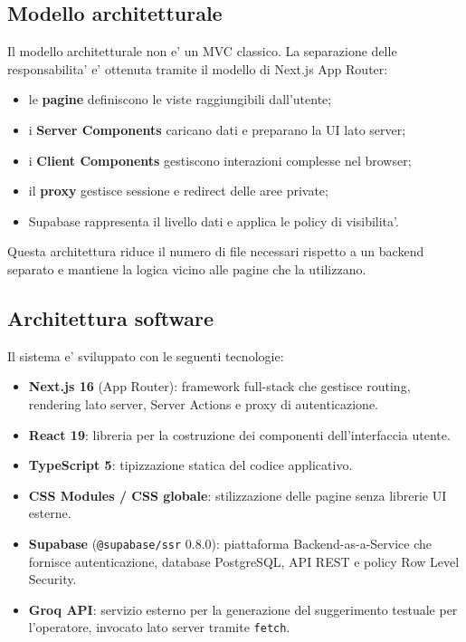 \subsection{Modello architetturale}

Il modello architetturale non e' un MVC classico. La separazione delle responsabilita' e' ottenuta tramite il modello di Next.js App Router:

\begin{itemize}
    \item le \textbf{pagine} definiscono le viste raggiungibili dall'utente;
    \item i \textbf{Server Components} caricano dati e preparano la UI lato server;
    \item i \textbf{Client Components} gestiscono interazioni complesse nel browser;
    \item il \textbf{proxy} gestisce sessione e redirect delle aree private;
    \item Supabase rappresenta il livello dati e applica le policy di visibilita'.
\end{itemize}

Questa architettura riduce il numero di file necessari rispetto a un backend separato e mantiene la logica vicino alle pagine che la utilizzano.

\subsection{Architettura software}

Il sistema e' sviluppato con le seguenti tecnologie:

\begin{itemize}
    \item \textbf{Next.js 16} (App Router): framework full-stack che gestisce routing, rendering lato server, Server Actions e proxy di autenticazione.
    \item \textbf{React 19}: libreria per la costruzione dei componenti dell'interfaccia utente.
    \item \textbf{TypeScript 5}: tipizzazione statica del codice applicativo.
    \item \textbf{CSS Modules / CSS globale}: stilizzazione delle pagine senza librerie UI esterne.
    \item \textbf{Supabase} (\texttt{@supabase/ssr} 0.8.0): piattaforma Backend-as-a-Service che fornisce autenticazione, database PostgreSQL, API REST e policy Row Level Security.
    \item \textbf{Groq API}: servizio esterno per la generazione del suggerimento testuale per l'operatore, invocato lato server tramite \texttt{fetch}.
\end{itemize}

